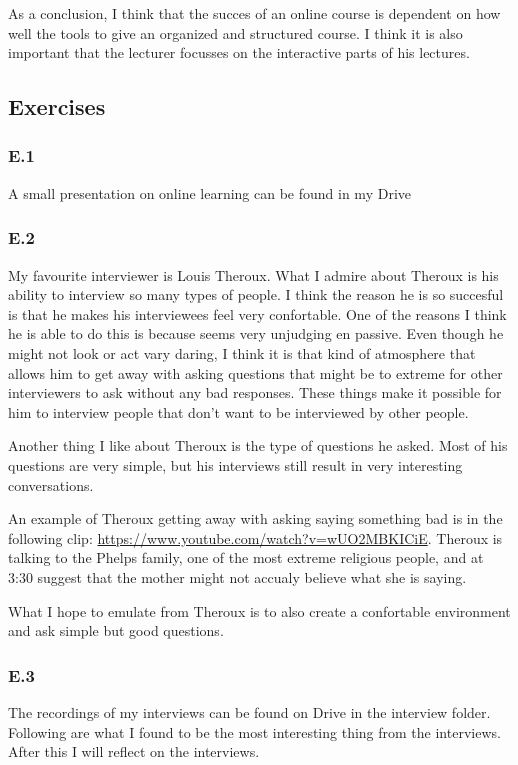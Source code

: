 \documentclass[]{article}
\begin{document}
As a conclusion, I think that the succes of an online course is dependent on how 
well the tools to give an organized and structured course. I think it is also important
that the lecturer focusses on the interactive parts of his lectures. 

\subsection*{Exercises}

\subsubsection*{E.1}
A small presentation on online learning can be found in my Drive

\subsubsection*{E.2}
My favourite interviewer is Louis Theroux. What I admire about Theroux is his 
ability to interview so many types of people. I think the reason he is so succesful
is that he makes his interviewees feel very confortable. One of the reasons I think 
he is able to do this is because seems very unjudging en passive. Even though he 
might not look or act vary daring, I think it is that kind of atmosphere that 
allows him to get away with asking questions that might be to extreme for other
interviewers to ask without any bad responses. These things make it possible for 
him to interview people that don't want to be interviewed by other people.

Another thing I like about Theroux is the type of questions he asked. Most 
of his questions are very simple, but his interviews still result in very 
interesting conversations. 

An example of Theroux getting away with asking saying something bad is in the following clip:
\url{https://www.youtube.com/watch?v=wUO2MBKICiE}.
Theroux is talking to the Phelps family, one of the most extreme religious people,
and at 3:30 suggest that the mother might not accualy believe what she is saying.

What I hope to emulate from Theroux is to also create a confortable environment
and ask simple but good questions. 

\subsubsection*{E.3}
The recordings of my interviews can be found on Drive in the interview folder. 
Following are what I found to be the most interesting thing from the interviews.
After this I will reflect on the interviews. 
\end{document}
